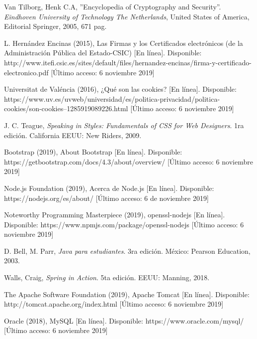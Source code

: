 \documentclass[12pt, a4paper, titlepage]{report}
\begin{document}
\begin{thebibliography}{20}
        Van Tilborg, Henk C.A, ''Encyclopedia of Cryptography and Security''. \textit{Eindhoven University of Technology The Netherlands}, United States of America, Editorial Springer, 2005, 671 pag. 
        
        L. Hernández Encinas (2015), Las Firmas y los Certificados electrónicos (de la Administración Pública del Estado-CSIC) [En línea]. Disponible: http://www.itefi.csic.es/sites/default/files/hernandez-encinas/firma-y-certificado-electronico.pdf [Último acceso: 6 noviembre 2019]
        
        Universitat de Valéncia (2016), ¿Qué son las cookies? [En línea]. Disponible:           https://www.uv.es/uvweb/universidad/es/politica-privacidad/politica-cookies/son-cookies--1285919089226.html [Último acceso: 6 noviembre 2019]
        
        J. C. Teague, \textit{Speaking in Styles: Fundamentals of CSS for Web Designers}. 1ra edición. California EEUU: New Riders, 2009.
        
        Bootstrap (2019), About Bootstrap [En línea]. Disponible: https://getbootstrap.com/docs/4.3/about/overview/ [Último acceso: 6 noviembre 2019]
        
        Node.js Foundation (2019), Acerca de Node.js [En línea]. Disponible: https://nodejs.org/es/about/ [Último acceso: 6 de noviembre 2019]
        
        Noteworthy Programming Masterpiece (2019), openssl-nodejs [En línea]. Disponible: https://www.npmjs.com/package/openssl-nodejs [Último acceso: 6 noviembre 2019]
        
        D. Bell, M. Parr, \textit{Java para estudiantes}. 3ra edición. México: Pearson Education, 2003.
        
        Walls, Craig, \textit{Spring in Action}. 5ta edición. EEUU: Manning, 2018.
        
        The Apache Software Foundation (2019), Apache Tomcat [En línea]. Disponible: http://tomcat.apache.org/index.html [Último acceso: 6 noviembre 2019]
        
        Oracle (2018), MySQL [En línea]. Disponible: https://www.oracle.com/mysql/ [Último acceso: 6 noviembre 2019]
        

\end{thebibliography}
\end{document}
